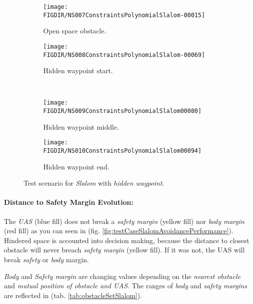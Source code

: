 \begin{figure}[H]
    \centering
    \begin{subfigure}{0.48\textwidth}
    	\centering
        \texttt{[image: \\FIGDIR/NS007ConstraintsPolynomialSlalom-00015]}
        \caption{Open space obstacle.}
        \label{fig:slalomOpenSpaceObstacle}
    \end{subfigure}
    \begin{subfigure}{0.48\textwidth}
    	\centering
        \texttt{[image: \\FIGDIR/NS008ConstraintsPolynomialSlalom-00069]} 
        \caption{Hidden waypoint start.}
        \label{fig:slalomHiddenWaypointStart}
    \end{subfigure}
    \\
    \begin{subfigure}{0.48\textwidth}
	    \centering
        \texttt{[image: \\FIGDIR/NS009ConstraintsPolynomialSlalom00080]} 
        \caption{Hidden waypoint middle.}
        \label{fig:slalomHiddenWaypointMiddle}
    \end{subfigure}
    \begin{subfigure}{0.48\textwidth}
    	\centering
        \texttt{[image: \\FIGDIR/NS010ConstraintsPolynomialSlalom00094]} 
        \caption{Hidden waypoint end.}
        \label{fig:slalomHiddenWaypointEnd}
    \end{subfigure}
    \caption{Test scenario for \emph{Slalom} with \emph{hidden waypoint}. }
    \label{fig:testCaseSlalomwithHiddenWaypoint}
\end{figure}


\paragraph{Distance to Safety Margin Evolution:} The \emph{UAS} (blue fill) does not break a \emph{safety margin} (yellow fill) nor \emph{body margin} (red fill) as you can seen in (fig. \ref{fig:testCaseSlalomAvoidancePerformance}). Hindered space is accounted into decision making, because the distance to closest obstacle will never breach \emph{safety margin} (yellow fill). If it was not, the UAS will break \emph{safety} or \emph{body} margin. 

\emph{Body} and \emph{Safety margin} are changing values depending on the \emph{nearest obstacle} and \emph{mutual position of obstacle and UAS}. The ranges of \emph{body} and \emph{safety margins} are reflected in (tab. \ref{tab:obstacleSetSlalom}). 

